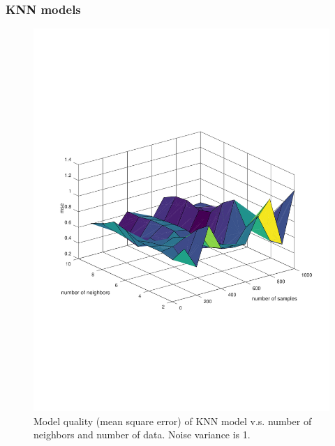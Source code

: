 \documentclass[]{article}
\begin{document}
\subsubsection{KNN models}
\begin{figure}[H]
	\centering
	\includegraphics[trim= 10cm 5cm 10cm 5cm, scale=0.4]{proj1-3_1d-neighbors}
	\caption{Model quality (mean square error) of KNN model v.s. number of neighbors and number of data. Noise variance is 1.}
	\label{fig:KNNnumberofdata}
\end{figure}
\end{document}
